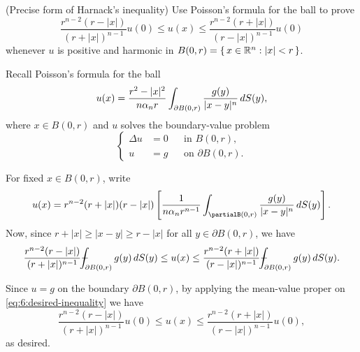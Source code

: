 \begin{problem}
  (Precise form of Harnack's inequality) Use Poisson's formula for the ball
  to prove
  \[
    \frac{r^{n-2}(r-|x|)}{(r+|x|)^{n-1}}u(0)%
    \leq u(x)%
    \leq \frac{r^{n-2}(r+|x|)}{(r-|x|)^{n-1}}u(0)
  \]
  whenever \(u\) is positive and harmonic in
  \(B(0,r)=\{\,x\in\mathbb{R}^n:|x|<r\,\}\).
\end{problem}
\begin{solution}
  Recall Poisson's formula for the ball
  \begin{equation}
    \label{eq:6:poissons-formula}
    u(x)=\frac{r^2-|x|^2}{n\alpha_nr}
    \int_{\partial B(0,r)}\frac{g(y)}{|x-y|^n}\mathop{}\!d S(y),
  \end{equation}
  where \(x\in B(0,r)\) and \(u\) solves the boundary-value problem
  \[
    \left\{
      \begin{aligned}
        \Delta u&=0&&\text{in \(B(0,r)\),}\\
        u&=g&&\text{on \(\partial B(0,r)\).}
      \end{aligned}
    \right.
  \]

  For fixed \(x\in B(0,r)\), write
  \[
    u(x)=r^{n-2}(r+|x|)(r-|x|)%
    \left[%
      \frac{1}{n\alpha_n r^{n-1}} \int_{\partial%
        B(0,r)}\frac{g(y)}{|x-y|^n}\diff S(y)%
    \right]%
    .
  \]
  Now, since \(r+|x|\geq |x-y|\geq r-|x|\) for all \(y\in\partial B(0,r)\),
  we have
  \begin{equation}
    \label{eq:6:desired-inequality}
    \frac{r^{n-2}(r-|x|)}{(r+|x|)^{n-1}}\dashint_{\partial
      B(0,r)}g(y)\diff S(y)\leq u(x)
    \leq\frac{r^{n-2}(r+|x|)}{(r-|x|)^{n-1}}\dashint_{\partial
      B(0,r)}g(y)\diff S(y).
  \end{equation}

  Since \(u=g\) on the boundary \(\partial B(0,r)\), by applying the
  mean-value proper on \eqref{eq:6:desired-inequality} we have
  \[
    \frac{r^{n-2}(r-|x|)}{(r+|x|)^{n-1}}u(0)\leq
    u(x)\leq
    \frac{r^{n-2}(r+|x|)}{(r-|x|)^{n-1}}u(0),
  \]
  as desired.
\end{solution}

